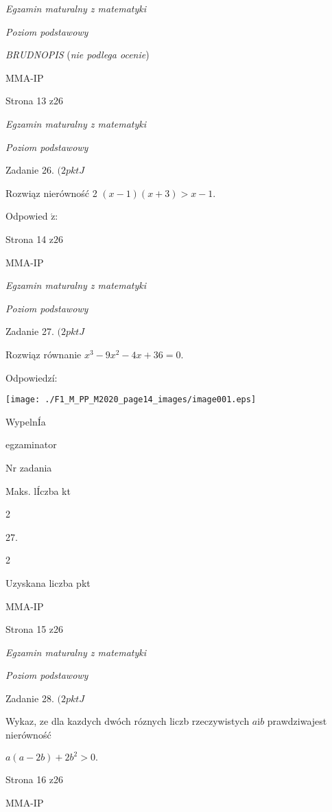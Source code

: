 \documentclass[a4paper,12pt]{article}
\begin{document}
{\it Egzamin maturalny z matematyki}

{\it Poziom podstawowy}

{\it BRUDNOPIS} ({\it nie podlega ocenie})

MMA-IP

Strona 13 z26





{\it Egzamin maturalny z matematyki}

{\it Poziom podstawowy}

Zadanie 26. $(2pktJ$

Rozwiąz nierówność 2 $(x-1)(x+3)>x-1.$

Odpowied $\acute{\mathrm{z}}$:

Strona 14 $\mathrm{z}26$

MMA-IP





{\it Egzamin maturalny z matematyki}

{\it Poziom podstawowy}

Zadanie 27. $(2pktJ$

Rozwiąz równanie $x^{3}-9x^{2}-4x+36=0.$

Odpowiedzí:
\begin{center}
\texttt{[image: ./F1\_M\_PP\_M2020\_page14\_images/image001.eps]}
\end{center}
WypelnÍa

egzaminator

Nr zadania

Maks. lÍczba kt

2

27.

2

Uzyskana liczba pkt

MMA-IP

Strona 15 z26





{\it Egzamin maturalny z matematyki}

{\it Poziom podstawowy}

Zadanie 28. $(2pktJ$

Wykaz, ze dla kazdych dwóch róznych liczb rzeczywistych $a\mathrm{i}b$ prawdziwajest nierówność

$a(a-2b)+2b^{2}>0.$

Strona 16 z26

MMA-IP
\end{document}
